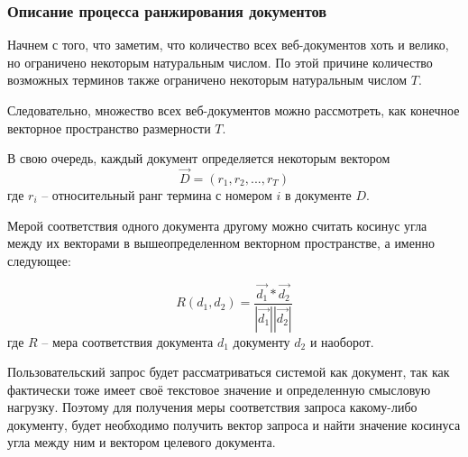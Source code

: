 \subsubsection{Описание процесса ранжирования документов}

Начнем с того, что заметим, что количество всех веб-документов хоть и велико, но ограничено некоторым натуральным числом. По этой причине количество возможных терминов также ограничено некоторым натуральным числом $T$. 

Следовательно, множество всех веб-документов можно рассмотреть, как конечное векторное пространство размерности $T$. 

В свою очередь, каждый документ определяется некоторым вектором
\begin{equation}
\vec{D}=(r_1, r_2, ..., r_T)
\end{equation} где $r_i$ -- относительный ранг термина с номером $i$ в документе $D$.

Мерой соответствия одного документа другому можно считать косинус угла между их векторами в вышеопределенном векторном пространстве, а именно следующее:

\begin{equation}
R(d_1, d_2)=\frac{\vec{d_1} * \vec{d_2}}{|\vec{d_1}| |\vec{d_2}|}
\end{equation} где $R$ -- мера соответствия документа $d_1$ документу $d_2$ и наоборот.

Пользовательский запрос будет рассматриваться системой как документ, так как фактически тоже имеет своё текстовое значение и определенную смысловую нагрузку. Поэтому для получения меры соответствия запроса какому-либо документу, будет необходимо получить вектор запроса и найти значение косинуса угла между ним и вектором целевого документа.

